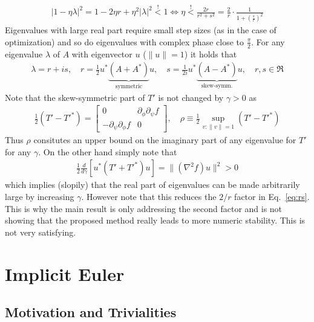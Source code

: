 \documentclass{article}
\begin{document}
\begin{align}
| 1 - \eta \lambda|^2 
= 1 - 2\eta r + \eta^2 |\lambda|^2 \stackrel !< 1 
\iff \eta  \stackrel !< \frac{2r}{r^2 + s^2} = \frac{2}{r} \cdot \frac{1}{1+(\frac{s}{r})^2}
\label{eq:rs}
\end{align}
Eigenvalues with large real part require small step sizes (as in the case of optimization) and so do eigenvalues with complex phase close to $\frac \pi2$. For any eigenvalue $\lambda$ of $A$ with eigenvector $u$ ($\| u\|=1$) it holds that 
\begin{align}
\lambda =  r + is, 
\quad 
r = \frac12 u^* 	\underbrace{ (A + A^*)}_{\text{symmetric}} u,
\quad 
s = \frac{1}{2i} u^* 	\underbrace{ (A - A^*)}_{\text{skew-symm.}} u, \quad r,s \in \Re
\end{align}
Note that the skew-symmetric part of $T'$ is not changed by $\gamma>0$ as
\begin{align}
\frac 12 ( T' - T'^*) = \begin{bmatrix} 0 & \partial_\phi \partial_\psi f \\ -\partial_\psi \partial_\phi f & 0 \end{bmatrix}, 
\quad 
\rho \equiv \frac 12 \sup_{v: \| v\|=1} ( T' - T'^*)
\end{align}
Thus $\rho$ consitutes an upper bound on the imaginary part of any eigenvalue for $T'$ for any $\gamma$. On the other hand simply note that
\begin{align}
\frac12 \frac{d}{d\gamma} \left[ u^* \left( T' + T'^*\right) u \right]  = \| (\nabla^2f) u\|^2 >0
\end{align}
which implies (slopily) that the real part of eigenvalues can be made arbitrarily large by increasing $\gamma$. However note that this reduces the $2/r$ factor in Eq.~\eqref{eq:rs}. This is why the main result \cite[Lemma 9]{mescheder2017numerics} is only addressing the second factor and is not showing that the proposed method really leads to more numeric stability. This is not very satisfying. 

\section{Implicit Euler} 

\subsection{Motivation and Trivialities}
\end{document}

